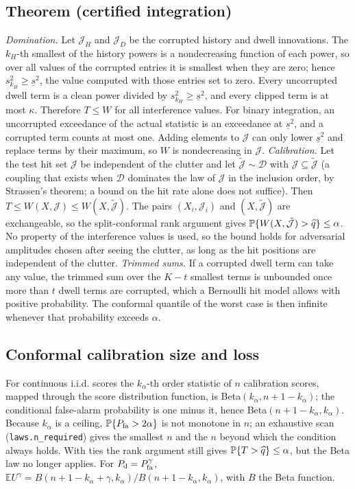\subsection{Theorem (certified integration)}
\emph{Domination.} Let $\mathcal J_H$ and $\mathcal J_D$ be the corrupted history and dwell innovations. The $k_H$-th smallest of the history powers is a nondecreasing function of each power, so over all values of the corrupted entries it is smallest when they are zero; hence $s_{k_H}^2\ge\underline s^2$, the value computed with those entries set to zero. Every uncorrupted dwell term is a clean power divided by $s_{k_H}^2\ge\underline s^2$, and every clipped term is at most $\kappa$. Therefore $T\le W$ for all interference values. For binary integration, an uncorrupted exceedance of the actual statistic is an exceedance at $\underline s^2$, and a corrupted term counts at most one. Adding elements to $\mathcal J$ can only lower $\underline s^2$ and replace terms by their maximum, so $W$ is nondecreasing in $\mathcal J$.
\emph{Calibration.} Let the test hit set $\mathcal J$ be independent of the clutter and let $\tilde{\mathcal J}\sim\mathcal D$ with $\mathcal J\subseteq\tilde{\mathcal J}$ (a coupling that exists when $\mathcal D$ dominates the law of $\mathcal J$ in the inclusion order, by Strassen's theorem; a bound on the hit rate alone does not suffice). Then $T\le W(X,\mathcal J)\le W(X,\tilde{\mathcal J})$. The pairs $(X_i,\mathcal J_i)$ and $(X,\tilde{\mathcal J})$ are exchangeable, so the split-conformal rank argument gives $\mathbb{P}\{W(X,\tilde{\mathcal J})>\widehat q\}\le\alpha$. No property of the interference values is used, so the bound holds for adversarial amplitudes chosen after seeing the clutter, as long as the hit positions are independent of the clutter.
\emph{Trimmed sums.} If a corrupted dwell term can take any value, the trimmed sum over the $K-t$ smallest terms is unbounded once more than $t$ dwell terms are corrupted, which a Bernoulli hit model allows with positive probability. The conformal quantile of the worst case is then infinite whenever that probability exceeds $\alpha$.

\subsection{Conformal calibration size and loss}
For continuous i.i.d. scores the $k_\alpha$-th order statistic of $n$ calibration scores, mapped through the score distribution function, is Beta$(k_\alpha,n+1-k_\alpha)$; the conditional false-alarm probability is one minus it, hence Beta$(n+1-k_\alpha,k_\alpha)$. Because $k_\alpha$ is a ceiling, $\mathbb{P}\{P_{\rm fa}>2\alpha\}$ is not monotone in $n$; an exhaustive scan (\texttt{laws.n\_required}) gives the smallest $n$ and the $n$ beyond which the condition always holds. With ties the rank argument still gives $\mathbb{P}\{T>\widehat q\}\le\alpha$, but the Beta law no longer applies. For $P_{\rm d}=P_{\rm fa}^{\gamma}$, $\mathbb EU^\gamma=B(n+1-k_\alpha+\gamma,k_\alpha)/B(n+1-k_\alpha,k_\alpha)$, with $B$ the Beta function.
